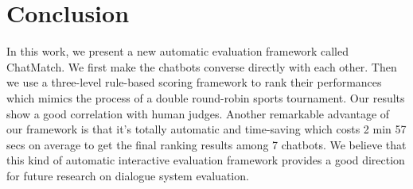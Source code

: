 \section{Conclusion}
\label{sec:conclude}
In this work, we present a new automatic evaluation framework called ChatMatch. 
We first make the chatbots converse directly with each other. 
Then we use a three-level rule-based scoring framework to rank their performances which mimics the process of a double round-robin sports tournament. 
Our results show a good correlation with human judges. Another remarkable advantage of our framework is that it's totally automatic and time-saving which costs 2 min 57 secs on average to get the final ranking results among 7 chatbots. 
We believe that this kind of automatic interactive evaluation framework provides a good direction for future research on dialogue system evaluation.

